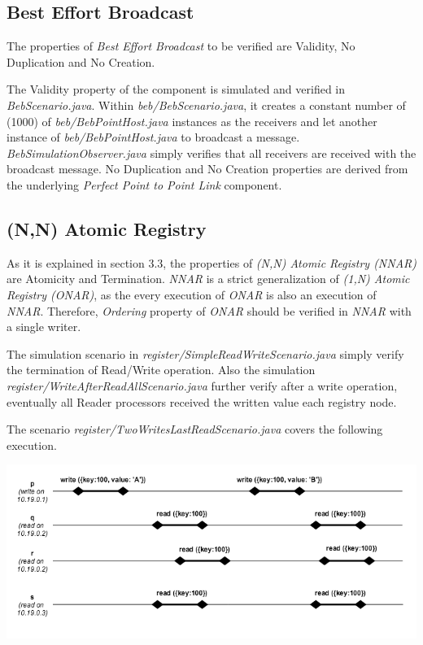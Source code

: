 \documentclass[a4paper, 11pt]{article}
\begin{document}
\subsection{Best Effort Broadcast}

The properties of \textit{Best Effort Broadcast} to be verified are Validity, No Duplication and No Creation.

The Validity property of the component is simulated and verified in \textit{BebScenario.java}. Within \textit{beb/BebScenario.java}, it creates a constant number of (1000) of \textit{beb/BebPointHost.java} instances as the receivers and let another instance of \textit{beb/BebPointHost.java} to broadcast a message. \textit{BebSimulationObserver.java} simply verifies that all receivers are received with the broadcast message. No Duplication and No Creation properties are derived from the underlying \textit{Perfect Point to Point Link} component.

\subsection{(N,N) Atomic Registry}

As it is explained in section 3.3, the properties of \textit{(N,N) Atomic Registry (NNAR)} are Atomicity and Termination. \textit{NNAR} is a strict generalization of \textit{(1,N) Atomic Registry (ONAR)}, as the every execution of \textit{ONAR} is also an execution of \textit{NNAR}. Therefore, \textit{Ordering} property of \textit{ONAR} should be verified in \textit{NNAR} with a single writer.

The simulation scenario in \textit{register/SimpleReadWriteScenario.java} simply verify the termination of Read/Write operation. Also the simulation \textit{register/WriteAfterReadAllScenario.java} further verify after a write operation, eventually all Reader processors received the written value each registry node.

The scenario \textit{register/TwoWritesLastReadScenario.java} covers the following execution.

{\centering\includegraphics[scale = 0.5]{./images/2writers_read_last.png}\par}
\end{document}
